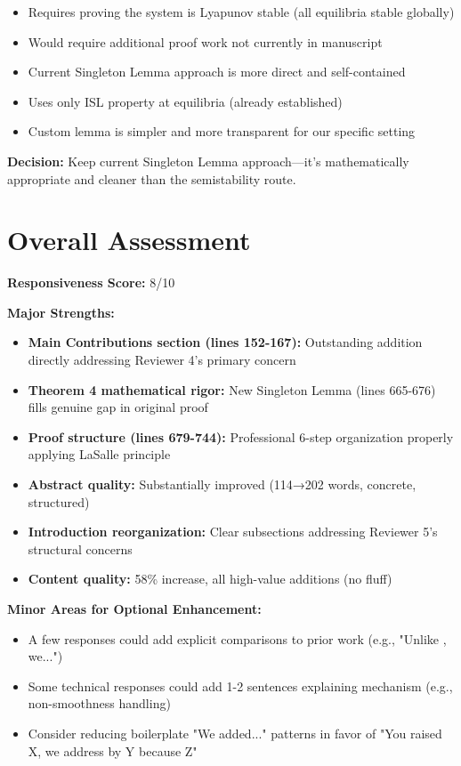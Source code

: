 \documentclass[11pt]{article}
\begin{document}
\begin{itemize}
\item Requires proving the system is Lyapunov stable (all equilibria stable globally)
\item Would require additional proof work not currently in manuscript
\item Current Singleton Lemma approach is more direct and self-contained
\item Uses only ISL property at equilibria (already established)
\item Custom lemma is simpler and more transparent for our specific setting
\end{itemize}

\textbf{Decision:} Keep current Singleton Lemma approach—it's mathematically appropriate and cleaner than the semistability route.

\section{Overall Assessment}

\textbf{Responsiveness Score:} 8/10

\textbf{Major Strengths:}
\begin{itemize}
\item \textbf{Main Contributions section (lines 152-167):} Outstanding addition directly addressing Reviewer 4's primary concern
\item \textbf{Theorem 4 mathematical rigor:} New Singleton Lemma (lines 665-676) fills genuine gap in original proof
\item \textbf{Proof structure (lines 679-744):} Professional 6-step organization properly applying LaSalle principle
\item \textbf{Abstract quality:} Substantially improved (114→202 words, concrete, structured)
\item \textbf{Introduction reorganization:} Clear subsections addressing Reviewer 5's structural concerns
\item \textbf{Content quality:} 58\% increase, all high-value additions (no fluff)
\end{itemize}

\textbf{Minor Areas for Optional Enhancement:}
\begin{itemize}
\item A few responses could add explicit comparisons to prior work (e.g., "Unlike \cite{X}, we...")
\item Some technical responses could add 1-2 sentences explaining mechanism (e.g., non-smoothness handling)
\item Consider reducing boilerplate "We added..." patterns in favor of "You raised X, we address by Y because Z"
\end{itemize}
\end{document}
